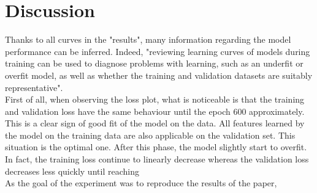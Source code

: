 \section{Discussion}
Thanks to all curves in the "results", many information regarding the model performance can be inferred. Indeed, "reviewing learning curves of models during training can be used to diagnose problems with learning, such as an underfit or overfit model, as well as whether the training and validation datasets are suitably representative"\cite{40}.\\
First of all, when observing the loss plot, what is noticeable is that the training and validation loss have the same behaviour until the epoch 600 approximately. This is a clear sign of good fit of the model on the data. All features learned by the model on the training data are also applicable on the validation set. This situation is the optimal one. After this phase, the model slightly start to overfit. In fact, the training loss continue to linearly decrease whereas the validation loss decreases less quickly until reaching  \\

As the goal of the experiment was to reproduce the results of the paper, 

